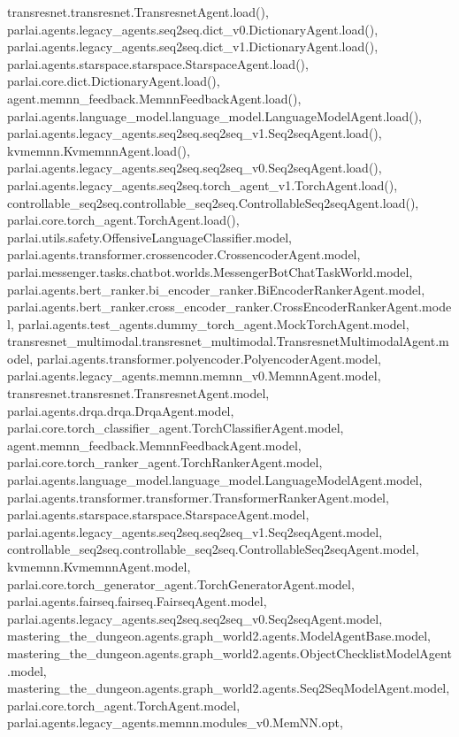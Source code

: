 transresnet.\+transresnet.\+Transresnet\+Agent.\+load(), parlai.\+agents.\+legacy\+\_\+agents.\+seq2seq.\+dict\+\_\+v0.\+Dictionary\+Agent.\+load(), parlai.\+agents.\+legacy\+\_\+agents.\+seq2seq.\+dict\+\_\+v1.\+Dictionary\+Agent.\+load(), parlai.\+agents.\+starspace.\+starspace.\+Starspace\+Agent.\+load(), parlai.\+core.\+dict.\+Dictionary\+Agent.\+load(), agent.\+memnn\+\_\+feedback.\+Memnn\+Feedback\+Agent.\+load(), parlai.\+agents.\+language\+\_\+model.\+language\+\_\+model.\+Language\+Model\+Agent.\+load(), parlai.\+agents.\+legacy\+\_\+agents.\+seq2seq.\+seq2seq\+\_\+v1.\+Seq2seq\+Agent.\+load(), kvmemnn.\+Kvmemnn\+Agent.\+load(), parlai.\+agents.\+legacy\+\_\+agents.\+seq2seq.\+seq2seq\+\_\+v0.\+Seq2seq\+Agent.\+load(), parlai.\+agents.\+legacy\+\_\+agents.\+seq2seq.\+torch\+\_\+agent\+\_\+v1.\+Torch\+Agent.\+load(), controllable\+\_\+seq2seq.\+controllable\+\_\+seq2seq.\+Controllable\+Seq2seq\+Agent.\+load(), parlai.\+core.\+torch\+\_\+agent.\+Torch\+Agent.\+load(), parlai.\+utils.\+safety.\+Offensive\+Language\+Classifier.\+model, parlai.\+agents.\+transformer.\+crossencoder.\+Crossencoder\+Agent.\+model, parlai.\+messenger.\+tasks.\+chatbot.\+worlds.\+Messenger\+Bot\+Chat\+Task\+World.\+model, parlai.\+agents.\+bert\+\_\+ranker.\+bi\+\_\+encoder\+\_\+ranker.\+Bi\+Encoder\+Ranker\+Agent.\+model, parlai.\+agents.\+bert\+\_\+ranker.\+cross\+\_\+encoder\+\_\+ranker.\+Cross\+Encoder\+Ranker\+Agent.\+model, parlai.\+agents.\+test\+\_\+agents.\+dummy\+\_\+torch\+\_\+agent.\+Mock\+Torch\+Agent.\+model, transresnet\+\_\+multimodal.\+transresnet\+\_\+multimodal.\+Transresnet\+Multimodal\+Agent.\+model, parlai.\+agents.\+transformer.\+polyencoder.\+Polyencoder\+Agent.\+model, parlai.\+agents.\+legacy\+\_\+agents.\+memnn.\+memnn\+\_\+v0.\+Memnn\+Agent.\+model, transresnet.\+transresnet.\+Transresnet\+Agent.\+model, parlai.\+agents.\+drqa.\+drqa.\+Drqa\+Agent.\+model, parlai.\+core.\+torch\+\_\+classifier\+\_\+agent.\+Torch\+Classifier\+Agent.\+model, agent.\+memnn\+\_\+feedback.\+Memnn\+Feedback\+Agent.\+model, parlai.\+core.\+torch\+\_\+ranker\+\_\+agent.\+Torch\+Ranker\+Agent.\+model, parlai.\+agents.\+language\+\_\+model.\+language\+\_\+model.\+Language\+Model\+Agent.\+model, parlai.\+agents.\+transformer.\+transformer.\+Transformer\+Ranker\+Agent.\+model, parlai.\+agents.\+starspace.\+starspace.\+Starspace\+Agent.\+model, parlai.\+agents.\+legacy\+\_\+agents.\+seq2seq.\+seq2seq\+\_\+v1.\+Seq2seq\+Agent.\+model, controllable\+\_\+seq2seq.\+controllable\+\_\+seq2seq.\+Controllable\+Seq2seq\+Agent.\+model, kvmemnn.\+Kvmemnn\+Agent.\+model, parlai.\+core.\+torch\+\_\+generator\+\_\+agent.\+Torch\+Generator\+Agent.\+model, parlai.\+agents.\+fairseq.\+fairseq.\+Fairseq\+Agent.\+model, parlai.\+agents.\+legacy\+\_\+agents.\+seq2seq.\+seq2seq\+\_\+v0.\+Seq2seq\+Agent.\+model, mastering\+\_\+the\+\_\+dungeon.\+agents.\+graph\+\_\+world2.\+agents.\+Model\+Agent\+Base.\+model, mastering\+\_\+the\+\_\+dungeon.\+agents.\+graph\+\_\+world2.\+agents.\+Object\+Checklist\+Model\+Agent.\+model, mastering\+\_\+the\+\_\+dungeon.\+agents.\+graph\+\_\+world2.\+agents.\+Seq2\+Seq\+Model\+Agent.\+model, parlai.\+core.\+torch\+\_\+agent.\+Torch\+Agent.\+model, parlai.\+agents.\+legacy\+\_\+agents.\+memnn.\+modules\+\_\+v0.\+Mem\+N\+N.\+opt, 